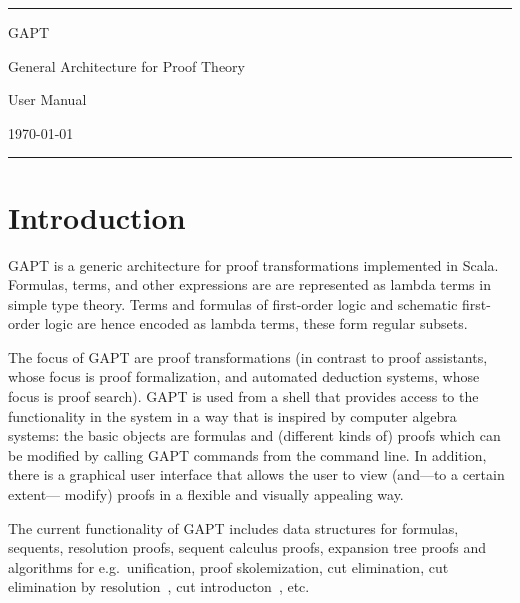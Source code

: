 \documentclass[a4paper,11pt]{article}
\begin{document}
\begin{titlepage}
\begin{center}

\hrule

\vspace*{20mm}

{\Huge GAPT}

\vspace*{5mm}

{\huge General Architecture for Proof Theory}

\vspace*{20mm}

{\Huge User Manual}

\vspace*{50mm}

{\Large \today}

\vspace*{20mm}

\hrule
\end{center}

\end{titlepage}

\listoffixmes

\tableofcontents
\vfill
\pagebreak

\section{Introduction}

GAPT is a generic architecture for proof transformations implemented in Scala.
Formulas, terms, and other expressions are are represented as lambda terms in
simple type theory.  Terms and formulas of first-order logic and schematic
first-order logic are hence encoded as lambda terms, these form regular
subsets.

The focus of GAPT are proof transformations (in contrast to proof assistants,
whose focus is proof formalization, and automated deduction systems, whose focus
is proof search). GAPT is used from a shell that provides access to the functionality
in the system in a way that is inspired by computer algebra systems: the basic
objects are formulas and (different kinds of) proofs which can be modified
by calling GAPT commands from the command line. In addition, there
is a graphical user interface that allows the user to view (and—to a certain extent—
modify) proofs in a flexible and visually appealing way.

The current functionality of GAPT includes data structures for formulas,
sequents, resolution proofs, sequent calculus proofs, expansion tree proofs
and algorithms for e.g.\ unification, proof skolemization, cut elimination,
cut elimination by resolution~\cite{Baaz00CutElimination}, cut introducton~\cite{Hetzl2012}, etc.
\end{document}
